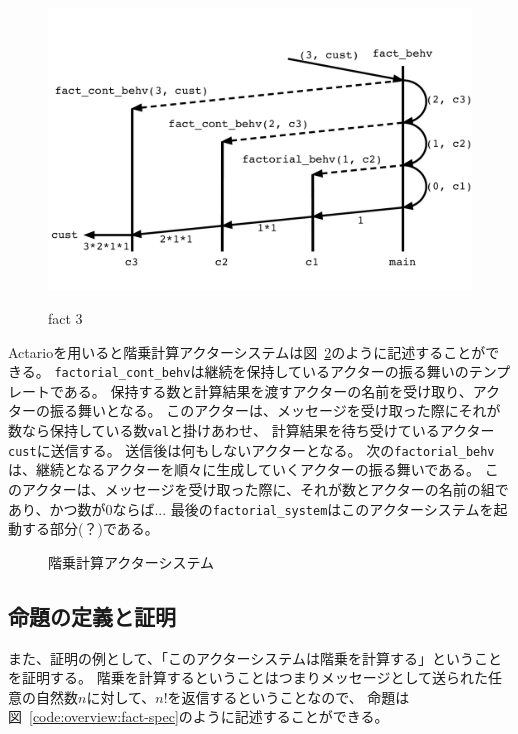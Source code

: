\begin{figure}[tp]
  \includegraphics[width=14cm]{./img/overview/fact.pdf}
  \label{img:overview:fact}
  \caption{fact 3}
\end{figure}

Actarioを用いると階乗計算アクターシステムは図~\ref{code:overview:fact-impl}のように記述することができる。
\texttt{factorial\_cont\_behv}は継続を保持しているアクターの振る舞いのテンプレートである。
保持する数と計算結果を渡すアクターの名前を受け取り、アクターの振る舞いとなる。
このアクターは、メッセージを受け取った際にそれが数なら保持している数\texttt{val}と掛けあわせ、
計算結果を待ち受けているアクター\texttt{cust}に送信する。
送信後は何もしないアクターとなる。
次の\texttt{factorial\_behv}は、継続となるアクターを順々に生成していくアクターの振る舞いである。
このアクターは、メッセージを受け取った際に、それが数とアクターの名前の組であり、かつ数が$0$ならば...
最後の\texttt{factorial\_system}はこのアクターシステムを起動する部分(？)である。

\begin{figure}[tp]
  
  \label{code:overview:fact-impl}
  \caption{階乗計算アクターシステム}
\end{figure}

\subsection{命題の定義と証明}

また、証明の例として、「このアクターシステムは階乗を計算する」ということを証明する。
階乗を計算するということはつまりメッセージとして送られた任意の自然数$n$に対して、$n!$を返信するということなので、
命題は図~\ref{code:overview:fact-spec}のように記述することができる。

